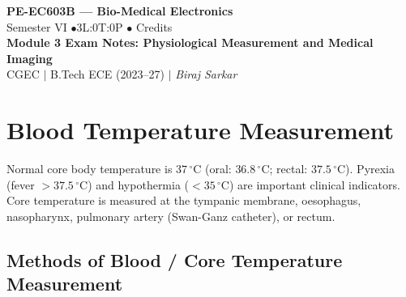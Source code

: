 \documentclass[12pt,a4paper]{article}
\begin{document}

\begin{center}
  {\LARGE\bfseries\color{myred} PE-EC603B --- Bio-Medical Electronics}\\[5pt]
  {\normalsize\color{mydark} Semester VI \quad$\bullet$\quad 3L:0T:0P \quad$\bullet$ Credits}\\[3pt]
  {\normalsize\color{myteal}\textbf{Module 3 Exam Notes: Physiological Measurement and Medical Imaging}}\\[3pt]
  {\small\color{mydark} CGEC \;$|$\; B.Tech ECE (2023--27) \;$|$\; \textit{Biraj Sarkar}}
\end{center}
\vspace{2pt}
\noindent{\color{myred}\rule{\linewidth}{1.5pt}}
\vspace{2pt}

\hypersetup{linkcolor=mydark}
\tableofcontents
\hypersetup{linkcolor=myteal}
\newpage

\section{Blood Temperature Measurement}

\begin{tcolorbox}[defbox, title={\textbf{Body Temperature and Its Clinical Significance}}]
Normal core body temperature is $37\,^{\circ}\text{C}$ (oral: $36.8\,^{\circ}\text{C}$; rectal: $37.5\,^{\circ}\text{C}$). Pyrexia (fever $> 37.5\,^{\circ}\text{C}$) and hypothermia ($< 35\,^{\circ}\text{C}$) are important clinical indicators. Core temperature is measured at the tympanic membrane, oesophagus, nasopharynx, pulmonary artery (Swan-Ganz catheter), or rectum.
\end{tcolorbox}

\subsection{Methods of Blood / Core Temperature Measurement}
\end{document}
